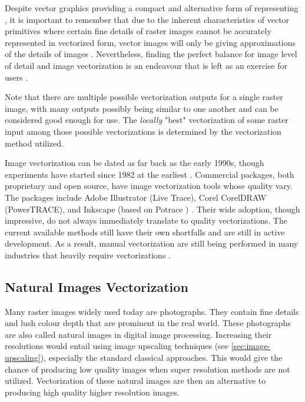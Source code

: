 Despite vector graphics providing a compact and alternative form of representing \cite{realtimevectorizationgpu}, it is important to remember that due to the inherent characteristics of vector primitives where certain fine details of raster images cannot be accurately represented in vectorized form, vector images will only be giving approximations of the details of images \cite{optimizedgradientmeshes}. Nevertheless, finding the perfect balance for image level of detail and image vectorization is an endeavour that is left as an exercise for users \cite{anovelmethodforvectorization}.

Note that there are multiple possible vectorization outputs for a single raster image, with many outputs possibly being similar to one another and can be considered good enough for use. The \textit{locally} "best" vectorization of some raster input among those possible vectorizations is determined by the vectorization method utilized.

Image vectorization can be dated as far back as the early 1990s, though experiments have started since 1982 at the earliest \cite{somexperimentsvectorization}. Commercial packages, both proprietary and open source, have image vectorization tools whose quality vary. The packages include Adobe Illustrator (Live Trace), Corel CorelDRAW (PowerTRACE), and Inkscape (based on Potrace \cite{inkscapepotrace}) \cite{hoshyari2018perceptiondriven}. Their wide adoption, though impressive, do not always immediately translate to quality vectorizations. The current available methods still have their own shortfalls and are still in active development. As a result, manual vectorization are still being performed in many industries that heavily require vectorizations \cite{vectorizationoflinedrawingspolyvector}.

\subsection{Natural Images Vectorization}
Many raster images widely used today are photographs. They contain fine details and lush colour depth that are prominent in the real world. These photographs are also called natural images in digital image processing. Increasing their resolutions would entail using image upscaling techniques (see \ref{sec:image-upscaling}), especially the standard classical approaches. This would give the chance of producing low quality images \cite{depixelizingpixelart} when super resolution methods are not utilized. Vectorization of these natural images are then an alternative to producing high quality higher resolution images.

